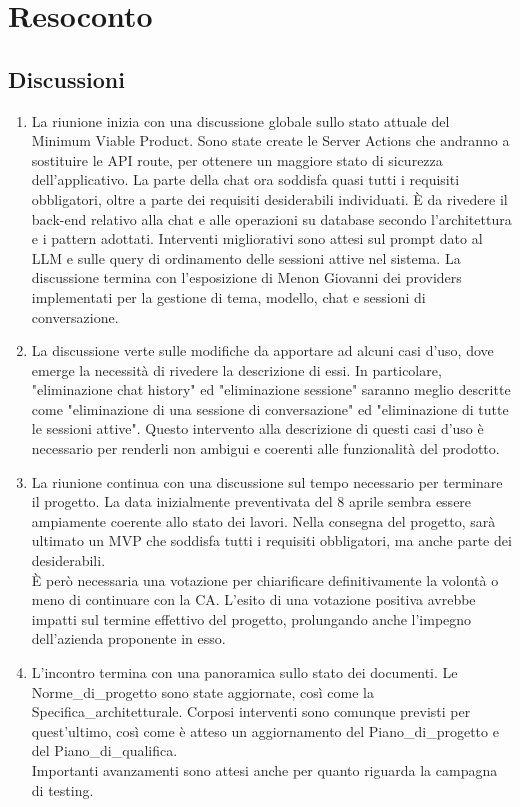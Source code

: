 \section{Resoconto} \label{sec:resoconto}
\subsection{Discussioni} \label{subsec:resdiscussione}
\begin{enumerate}
    \item La riunione inizia con una discussione globale sullo stato attuale del Minimum Viable Product. Sono state create le Server Actions che andranno a sostituire le API route, per ottenere un maggiore stato di sicurezza dell'applicativo. La parte della chat ora soddisfa quasi tutti i requisiti obbligatori, oltre a parte dei requisiti desiderabili individuati. È da rivedere il back-end relativo alla chat e alle operazioni su database secondo l'architettura e i pattern adottati. Interventi migliorativi sono attesi sul prompt dato al LLM e sulle query di ordinamento delle sessioni attive nel sistema. La discussione termina con l'esposizione di Menon Giovanni dei providers implementati per la gestione di tema, modello, chat e sessioni di conversazione.
    \item La discussione verte sulle modifiche da apportare ad alcuni casi d'uso, dove emerge la necessità di rivedere la descrizione di essi. In particolare, "eliminazione chat history" ed "eliminazione sessione" saranno meglio descritte come "eliminazione di una sessione di conversazione" ed "eliminazione di tutte le sessioni attive". Questo intervento alla descrizione di questi casi d'uso è necessario per renderli non ambigui e coerenti alle funzionalità del prodotto.
    \item La riunione continua con una discussione sul tempo necessario per terminare il progetto. La data inizialmente preventivata del 8 aprile sembra essere ampiamente coerente allo stato dei lavori. Nella consegna del progetto, sarà ultimato un MVP che soddisfa tutti i requisiti obbligatori, ma anche parte dei desiderabili.\\
    È però necessaria una votazione per chiarificare definitivamente la volontà o meno di continuare con la CA. L'esito di una votazione positiva avrebbe impatti sul termine effettivo del progetto, prolungando anche l'impegno dell'azienda proponente in esso.
    \item L'incontro termina con una panoramica sullo stato dei documenti. Le Norme\_di\_progetto sono state aggiornate, così come la Specifica\_architetturale. Corposi interventi sono comunque previsti per quest'ultimo, così come è atteso un aggiornamento del Piano\_di\_progetto e del Piano\_di\_qualifica.\\
    Importanti avanzamenti sono attesi anche per quanto riguarda la campagna di testing.
\end{enumerate}

